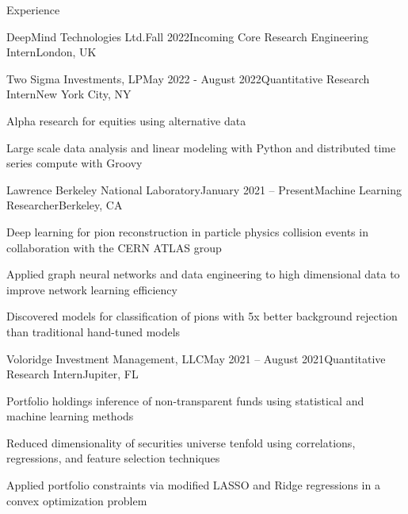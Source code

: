 \documentclass{resume} %
\begin{document}
\begin{rSection}{Experience}

\begin{rSubsection}{DeepMind Technologies Ltd.}{Fall 2022}{Incoming Core Research Engineering Intern}{London, UK}
    \item
\end{rSubsection}
\vspace{-1.35em}

\begin{rSubsection}{Two Sigma Investments, LP}{May 2022 - August 2022}{Quantitative Research Intern}{New York City, NY}
     \item Alpha research for equities using alternative data
     \item Large scale data analysis and linear modeling with Python and distributed time series compute with Groovy
\end{rSubsection}

\begin{rSubsection}{Lawrence Berkeley National Laboratory}{January 2021 – Present}{Machine Learning Researcher}{Berkeley, CA}
    \item Deep learning for pion reconstruction in particle physics collision events in collaboration with the CERN ATLAS group
    \item Applied graph neural networks and data engineering to high dimensional data to improve network learning efficiency
    \item Discovered models for classification of pions with 5x better background rejection than traditional hand-tuned models
\end{rSubsection}

\begin{rSubsection}{Voloridge Investment Management, LLC}{May 2021 – August 2021}{Quantitative Research Intern}{Jupiter, FL}
    \item Portfolio holdings inference of non-transparent funds using statistical and machine learning methods
    \item Reduced dimensionality of securities universe tenfold using correlations, regressions, and feature selection techniques
    \item Applied portfolio constraints via modified LASSO and Ridge regressions in a convex optimization problem
\end{rSubsection}


\end{rSection}
\end{document}
